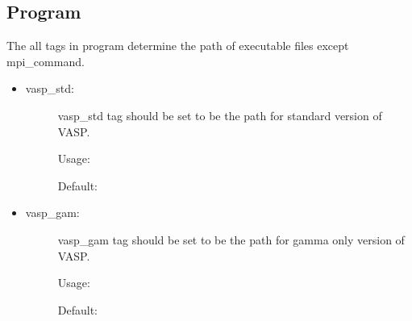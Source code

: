 \documentclass[letterpaper,10pt,english]{sphinxmanual}
\begin{document}
\subsection{Program}
\label{\detokenize{Input/Configuration:program}}
The all tags in program determine the path of executable files except mpi\_command.
\begin{itemize}
\item {} \begin{description}
\item[{vasp\_std:}] \leavevmode
vasp\_std tag should be set to be the path for standard version of VASP.

Usage:

\begin{sphinxVerbatim}[commandchars=\\\{\}]
   \PYG{p}{[}\PYG{p}{]}
\end{sphinxVerbatim}

Default:

\begin{sphinxVerbatim}[commandchars=\\\{\}]
   
\end{sphinxVerbatim}

\end{description}

\item {} \begin{description}
\item[{vasp\_gam:}] \leavevmode
vasp\_gam tag should be set to be the path for gamma only version of VASP.

Usage:

\begin{sphinxVerbatim}[commandchars=\\\{\}]
   \PYG{p}{[}\PYG{p}{]}
\end{sphinxVerbatim}

Default:

\begin{sphinxVerbatim}[commandchars=\\\{\}]
   
\end{sphinxVerbatim}

\end{description}


\end{itemize}
\end{document}
